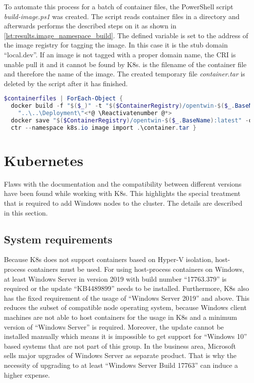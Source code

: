 To automate this process for a batch of container files, the PowerShell script \textit{build-image.ps1} was created. The script reads container files in a directory and afterwards performs the described steps on it as shown in \autoref{lst:results.image_namespace_build}.
The defined variable  is set to the address of the image registry for tagging the image. In this case it is the stub domain \enquote{local.dev}. If an image is not tagged with a proper domain name, the \ac{CRI} is unable pull it and it cannot be found by \ac{K8s}.
 is the filename of the container file and therefore the name of the image. The created temporary file \textit{container.tar} is deleted by the script after it has finished.
\begin{lstlisting}[caption={Crucial commands used in the custom PowerShell script to automate process of image building.}, label=lst:results.image_namespace_build, language=powershell, morekeywords={docker, ctr}]
$containerfiles | ForEach-Object {
  docker build -f "$($_)" -t "$($ContainerRegistry)/opentwin-$($_.BaseName):latest" \<*@ \Suppressnumber @*>
    "..\..\Deployment\"<*@ \Reactivatenumber @*>
  docker save "$($ContainerRegistry)/opentwin-$($_.BaseName):latest" -o container.tar
  ctr --namespace k8s.io image import .\container.tar }
\end{lstlisting}


\section{Kubernetes}
Flaws with the documentation and the compatibility between different versions have been found while working with \ac{K8s}. This highlights the special treatment that is required to add \ac{Windows} nodes to the cluster. The details are described in this section.
 
\subsection{System requirements}
Because \ac{K8s} does not support containers based on Hyper-V isolation\cite{Kubernetes.20230227}, host-process containers must be used.
For using host-process containers on \ac{Windows}, at least Windows Server in version 2019 with build number \enquote{17763.379} is required or the update \enquote{KB4489899} needs to be installed\cite{GitHubKubernetesSIGWindowsTools.20230213}. Furthermore, \ac{K8s} also has the fixed requirement of the usage of \enquote{Windows Server 2019} and above\cite{Kubernetes.20230227}. This reduces the subset of compatible node operating system, because \ac{Windows} client machines are not able to host containers for the usage in \ac{K8s} and a minimum version of \enquote{Windows Server} is required.
Moreover, the update cannot be installed manually which means it is impossible to get support for \enquote{Windows 10} based systems that are not part of this group. In the business area, Microsoft sells major upgrades of Windows Server as separate product. That is why the necessity of upgrading to at least \enquote{Windows Server Build 17763} can induce a higher expense.

